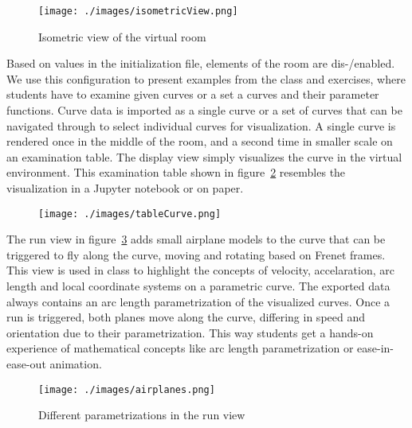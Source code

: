 \documentclass{VRARWorkshop}
\begin{document}
\begin{figure}[h!]
  \begin{center}
  \texttt{[image: ./images/isometricView.png]}
  \caption{\label{fig:isoView}
           Isometric view of the virtual room}
   \end{center}
\end{figure}


Based on values in the initialization file, elements of the room are dis-/enabled.
We use this configuration to present examples from the class and exercises, where students have to examine given curves or a set a curves and their parameter functions.
Curve data is imported as a single curve or a set of curves that can be navigated through to select individual curves for visualization.
A single curve is rendered once in the middle of the room, and a second time in smaller scale on an examination table.
The display view simply visualizes the curve in the virtual environment. This examination table shown in figure~\ref{fig:table} resembles the visualization in a Jupyter notebook or on paper.


\begin{figure}[h!]
    \begin{center}
        \texttt{[image: ./images/tableCurve.png]}
        \caption{\label{fig:table}}
    \end{center}
\end{figure}

The run view in figure~\ref{fig:airplanes} adds small airplane models to the curve that can be triggered to fly along the curve, moving and rotating based on Frenet frames.
This view is used in class to highlight the concepts of velocity, accelaration, arc length and local coordinate systems on a parametric curve.
The exported data always contains an arc length parametrization of the visualized curves.
Once a run is triggered, both planes move along the curve, differing in speed and orientation due to their parametrization.
This way students get a hands-on experience of mathematical concepts like arc length parametrization or ease-in-ease-out animation.

\begin{figure}[h!]
  \begin{center}
  \texttt{[image: ./images/airplanes.png]}
  \caption{\label{fig:airplanes}
           Different parametrizations in the run view}
   \end{center}
\end{figure}
\end{document}
